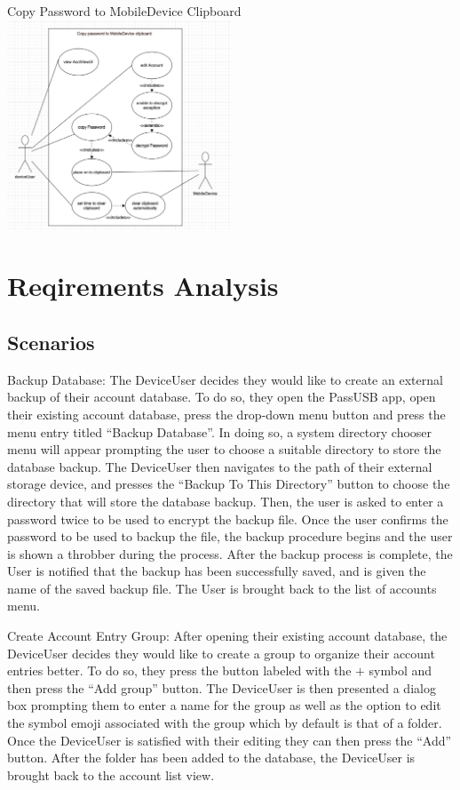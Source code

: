 \documentclass[stu]{apa7}
\begin{document}
{{{{Copy Password to MobileDevice Clipboard
\includegraphics[width=0.5\textwidth]{diag/rjm/uc2.png}

\section{Reqirements Analysis}

\subsection{Scenarios}

Backup Database: The DeviceUser decides they would like to create an external backup of their account database. To do so, they open the PassUSB app, open their existing account database, press the drop-down menu button and press the menu entry titled ``Backup Database''. In doing so, a system directory chooser menu will appear prompting the user to choose a suitable directory to store the database backup. The DeviceUser then navigates to the path of their external storage device, and presses the ``Backup To This Directory'' button to choose the directory that will store the database backup. Then, the user is asked to enter a password twice to be used to encrypt the backup file. Once the user confirms the password to be used to backup the file, the backup procedure begins and the user is shown a throbber during the process. After the backup process is complete, the User is notified that the backup has been successfully saved, and is given the name of the saved backup file. The User is brought back to the list of accounts menu.

Create Account Entry Group: After opening their existing account database, the DeviceUser decides they would like to create a group to organize their account entries better. To do so, they press the button labeled with the $+$ symbol and then press the ``Add group'' button. The DeviceUser is then presented a dialog box prompting them to enter a name for the group as well as the option to edit the symbol emoji associated with the group which by default is that of a folder. Once the DeviceUser is satisfied with their editing they can then press the ``Add''  button. After the folder has been added to the database, the DeviceUser is brought back to the account list view.

}}}}
\end{document}
